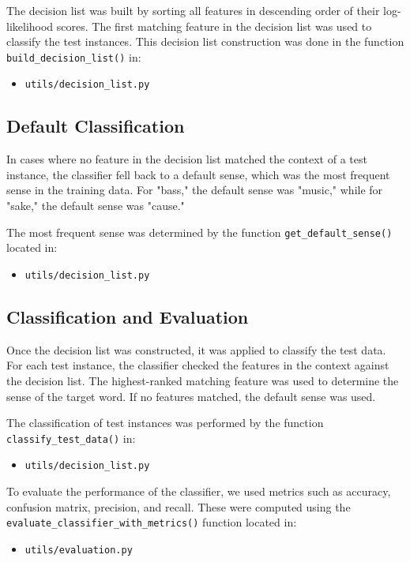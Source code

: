 \documentclass[journal,onecolumn]{IEEEtran}
\begin{document}
The decision list was built by sorting all features in descending order of their log-likelihood scores. The first matching feature in the decision list was used to classify the test instances. This decision list construction was done in the function \texttt{build\_decision\_list()} in:
\begin{itemize}
    \item \texttt{utils/decision\_list.py}
\end{itemize}

\subsection{Default Classification}
In cases where no feature in the decision list matched the context of a test instance, the classifier fell back to a default sense, which was the most frequent sense in the training data. For "bass," the default sense was "music," while for "sake," the default sense was "cause."

The most frequent sense was determined by the function \texttt{get\_default\_sense()} located in:
\begin{itemize}
    \item \texttt{utils/decision\_list.py}
\end{itemize}

\subsection{Classification and Evaluation}
Once the decision list was constructed, it was applied to classify the test data. For each test instance, the classifier checked the features in the context against the decision list. The highest-ranked matching feature was used to determine the sense of the target word. If no features matched, the default sense was used.

The classification of test instances was performed by the function \texttt{classify\_test\_data()} in:
\begin{itemize}
    \item \texttt{utils/decision\_list.py}
\end{itemize}

To evaluate the performance of the classifier, we used metrics such as accuracy, confusion matrix, precision, and recall. These were computed using the \texttt{evaluate\_classifier\_with\_metrics()} function located in:
\begin{itemize}
    \item \texttt{utils/evaluation.py}
\end{itemize}
\end{document}
